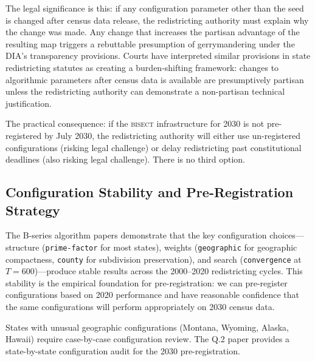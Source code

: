 The legal significance is this: if any configuration parameter other than the seed
is changed after census data release, the redistricting authority must explain why
the change was made. Any change that increases the partisan advantage of the resulting
map triggers a rebuttable presumption of gerrymandering under the DIA's transparency
provisions. Courts have interpreted similar provisions in state redistricting statutes
as creating a burden-shifting framework: changes to algorithmic parameters after
census data is available are presumptively partisan unless the redistricting authority
can demonstrate a non-partisan technical justification.

The practical consequence: if the \textsc{bisect} infrastructure for 2030 is not
pre-registered by July 2030, the redistricting authority will either use un-registered
configurations (risking legal challenge) or delay redistricting past constitutional
deadlines (also risking legal challenge). There is no third option.

\subsection{Configuration Stability and Pre-Registration Strategy}

The B-series algorithm papers demonstrate that the key configuration choices---structure
(\texttt{prime-factor} for most states), weights (\texttt{geographic} for geographic
compactness, \texttt{county} for subdivision preservation), and search (\texttt{convergence}
at $T=600$)---produce stable results across the 2000--2020 redistricting cycles. This
stability is the empirical foundation for pre-registration: we can pre-register
configurations based on 2020 performance and have reasonable confidence that the
same configurations will perform appropriately on 2030 census data.

States with unusual geographic configurations (Montana, Wyoming, Alaska, Hawaii)
require case-by-case configuration review. The Q.2 paper provides a state-by-state
configuration audit for the 2030 pre-registration.

